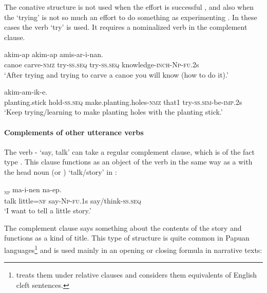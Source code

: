 The conative structure is not used when the effort is successful , and also when the `trying' is not so much an effort to do something as experimenting .  In these cases the verb  `try' is used. It requires a nominalized verb in the complement clause. 

\ea%
\label{ex:8:x375}
  akim-ap  akim-ap amis-ar-i-nan.\\
canoe  carve-\textsc{nmz} try-\textsc{ss}.\textsc{seq} try-\textsc{ss}.\textsc{seq} knowledge-\textsc{inch}-\textsc{Np}-\textsc{fu}.2s\\
\glt`After trying and trying to carve a canoe you will know (how to do it).'
\z


\ea%
\label{ex:8:x376}
  akim-am-ik-e.\\
planting.stick hold-\textsc{ss}.\textsc{seq} make.planting.holes-\textsc{nmz} that1 try-\textsc{ss}.\textsc{sim}-be-\textsc{imp}.2s\\
\glt`Keep trying/learning to make planting holes with the planting stick.'
\z


\paragraph[Complements of other utterance verbs ]{Complements of other utterance verbs} 

The verb - `say, talk' can take a regular complement clause, which is of the fact type \citep[389]{Dixon2010b}. This clause functions as an object of the verb in the same way as a  with the head noun  (or ) `talk/story' in :

\ea%
\label{ex:8:x1595}
\gll [Opora  gelemuta=ko]\textsubscript{\textsc{np}}  ma-i-nen  na-ep.\\
talk  little=\textsc{nf} say-\textsc{Np}-\textsc{fu}.1s say/think-\textsc{ss}.\textsc{seq}\\
\glt`I want to tell a little story.'
\z


The complement clause says something about the contents of the story and functions as a kind of title. This type of structure is quite common in Papuan languages\footnote{\citet[231]{Reesink1987} treats them under relative clauses and considers them equivalents of English cleft sentences.} and is used mainly in an opening or closing formula in narrative texts: 

